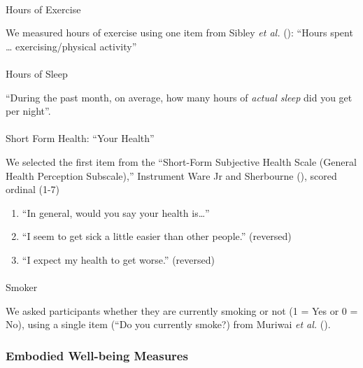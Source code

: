 \documentclass[
  single column]{article}
\makeatletter
\let\oldparagraph\paragraph
\renewcommand{\paragraph}{
    \@ifstar
      \xxxParagraphStar
      \xxxParagraphNoStar
  }
\newcommand{\xxxParagraphStar}[1]{\oldparagraph*{#1}\mbox{}}
\newcommand{\xxxParagraphNoStar}[1]{\oldparagraph{#1}\mbox{}}
\providecommand{\tightlist}{%
  \setlength{\itemsep}{0pt}\setlength{\parskip}{0pt}}\usepackage{longtable,booktabs,array}
\makeatother
\begin{document}
\paragraph{Hours of Exercise}\label{hours-of-exercise}

We measured hours of exercise using one item from Sibley \emph{et al.}
(): ``Hours spent \ldots{}
exercising/physical activity''

\paragraph{Hours of Sleep}\label{hours-of-sleep}

``During the past month, on average, how many hours of \emph{actual
sleep} did you get per night''.

\paragraph{Short Form Health: ``Your
Health''}\label{short-form-health-your-health}

We selected the first item from the ``Short-Form Subjective Health Scale
(General Health Perception Subscale),'' Instrument Ware Jr and
Sherbourne (), scored ordinal
(1-7)

\begin{enumerate}
\def\labelenumi{\arabic{enumi}.}
\tightlist
\item
  ``In general, would you say your health is\ldots{}''
\item
  ``I seem to get sick a little easier than other people.'' (reversed)
\item
  ``I expect my health to get worse.'' (reversed)
\end{enumerate}

\paragraph{Smoker}\label{smoker}

We asked participants whether they are currently smoking or not (1 = Yes
or 0 = No), using a single item (``Do you currently smoke?) from Muriwai
\emph{et al.} ().

\subsubsection{Embodied Well-being
Measures}\label{embodied-well-being-measures}
\end{document}
